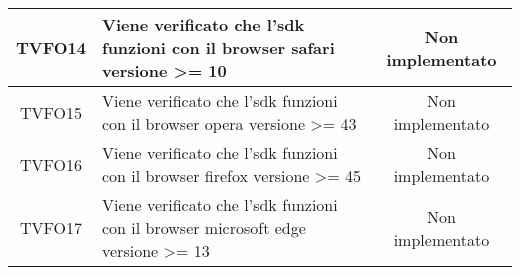 \begin{center}
\begin{longtable}{|c|>{\centering}m{10cm}|c|}
		TVFO14 & Viene verificato che l'sdk funzioni con il browser safari versione >= 10 & Non implementato \\ \hline
		TVFO15 & Viene verificato che l'sdk funzioni con il browser opera versione >= 43 & Non implementato \\ \hline
		TVFO16 & Viene verificato che l'sdk funzioni con il browser firefox versione >= 45 & Non implementato \\ \hline
		TVFO17 & Viene verificato che l'sdk funzioni con il browser microsoft edge versione >= 13 & Non implementato \\ \hline
	\end{longtable}
\end{center}

